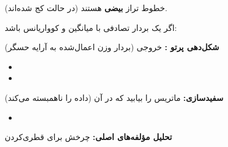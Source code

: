 خطوط تراز \textbf{بیضی} هستند (در حالت  کج شده‌اند).



اگر  یک بردار تصادفی با میانگین  و کوواریانس  باشد:



\textbf{شکل‌دهی پرتو :} خروجی  (بردار وزن اعمال‌شده به آرایه حسگر)

\begin{itemize}
\tightlist
\item
\item
\end{itemize}

\textbf{سفیدسازی:} ماتریس  را بیابید که در آن  (داده را ناهمبسته می‌کند)

\begin{itemize}
\tightlist
\item
\end{itemize}

\textbf{تحلیل مؤلفه‌های اصلی:} چرخش برای قطری‌کردن \lr{$\Sigma$}


